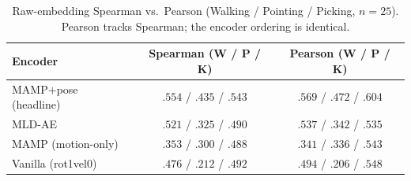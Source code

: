 \documentclass[letterpaper]{article} %
\begin{document}
\begin{table}[h]
\centering
\small
\setlength{\tabcolsep}{4pt}
\caption{Raw-embedding Spearman vs.\ Pearson (Walking / Pointing / Picking, $n=25$). Pearson tracks
Spearman; the encoder ordering is identical.}
\begin{tabular}{lcc}
\toprule
Encoder & Spearman (W / P / K) & Pearson (W / P / K) \\
\midrule
MAMP$+$pose (headline) & $.554$ / $.435$ / $.543$ & $.569$ / $.472$ / $.604$ \\
MLD-AE                 & $.521$ / $.325$ / $.490$ & $.537$ / $.342$ / $.535$ \\
MAMP (motion-only)     & $.353$ / $.300$ / $.488$ & $.341$ / $.336$ / $.543$ \\
Vanilla (rot1vel0)     & $.476$ / $.212$ / $.492$ & $.494$ / $.206$ / $.548$ \\
\bottomrule
\end{tabular}
\end{table}


\end{document}
